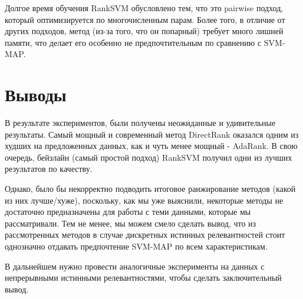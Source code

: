 \documentclass{article}[16pt]
\begin{document}
	Долгое время обучения RankSVM обусловлено тем, что это pairwise подход, который оптимизируется по многочисленным парам. Более того, в отличие от других подходов, метод (из-за того, что он попарный) требует много лишней памяти, что делает его особенно не предпочтительным по сравнению с SVM-MAP.
	
	\section{Выводы}
	В результате экспериментов, были получены неожиданные и удивительные результаты. Самый мощный и современный метод DirectRank оказался одним из худших на предложенных данных, как и чуть менее мощный - AdaRank. В свою очередь, бейзлайн (самый простой подход)  RankSVM получил одни из лучших результатов по качеству.
	
	Однако, было бы некорректно подводить итоговое ранжирование методов (какой из них лучше/хуже), поскольку, как мы уже выяснили, некоторые методы не достаточно предназначены для работы с теми данными, которые мы рассматривали. Тем не менее, мы можем смело сделать вывод, что из рассмотренных методов в случае дискретных истинных релевантностей стоит однозначно отдавать предпочтение SVM-MAP по всем характеристикам.
	
	В дальнейшем нужно провести аналогичные эксперименты на данных с непрерывными истинными релевантностями, чтобы сделать заключительный вывод.
	
\end{document}
